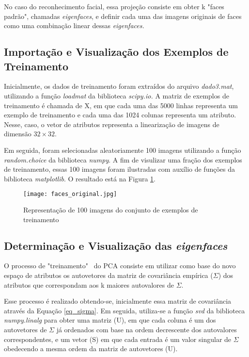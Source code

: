 \documentclass[12pt]{article}
\begin{document}
No caso do reconhecimento facial, essa projeção consiste em obter k "faces padrão", chamadas \textit{eigenfaces}, e definir cada uma das imagens originais de faces como uma combinação linear dessas \textit{eigenfaces.}

\subsection{Importação e Visualização dos Exemplos de Treinamento} 
Inicialmente, os dados de treinamento foram extraídos do arquivo \textit{dado3.mat}, utilizando a função \textit{loadmat} da biblioteca \textit{scipy.io.} A matriz de exemplos de treinamento é chamada de X, em que cada uma das 5000 linhas representa um exemplo de treinamento e cada uma das 1024 colunas representa um atributo. Nesse, caso, o vetor de atributos representa a linearização de imagens de dimensão $32 \times 32$.

Em seguida, foram selecionadas aleatoriamente 100 imagens utilizando a função \textit{random.choice} da biblioteca \textit{numpy}. A fim de visulizar uma fração dos exemplos de treinamento, essas 100 imagens foram ilustradas com auxílio de funções da biblioteca \textit{matplotlib}. O resultado está na Figura \ref{faces_original}. 

\begin{figure} [htp]
\begin{center}
\texttt{[image: faces\_original.jpg]}
\caption{Representação de 100 imagens do conjunto de exemplos de treinamento} \label{faces_original}
\end{center}
\end{figure}

\subsection{Determinação e Visualização das \textit{eigenfaces}}
O processo de "treinamento" \ do PCA consiste em utilizar como base do novo espaço de atributos os autovetores da matriz de covariância empírica ($\Sigma$) dos atributos que correspondam aos k maiores autovalores de $\Sigma$. 

Esse processo é realizado obtendo-se, inicialmente essa matriz de covariância através da Equação \ref{eq_sigma}. Em seguida, utiliza-se a função \textit{svd} da biblioteca \textit{numpy.linalg} para obter uma matriz (U), em que cada coluna é um dos autovetores de $\Sigma$ já ordenados com base na ordem decrescente dos autovalores correspondentes, e um vetor (S) em que cada entrada é um valor singular de $\Sigma$ obedecendo a mesma ordem da matriz de autovetores (U).
\end{document}
